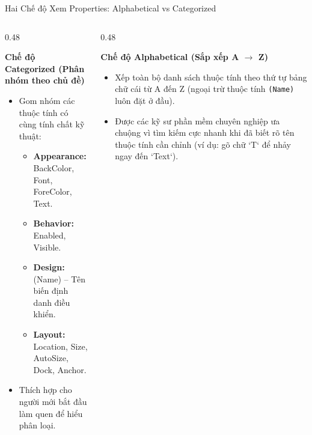 \documentclass[aspectratio=169, 10pt]{beamer}
\begin{document}
\begin{frame}{Hai Chế độ Xem Properties: Alphabetical vs Categorized}
  \begin{columns}[T]
    \begin{column}{0.48\textwidth}
      \begin{block}{\textbf{Chế độ Categorized (Phân nhóm theo chủ đề)}}
        \begin{itemize}\small
          \item Gom nhóm các thuộc tính có cùng tính chất kỹ thuật:
            \begin{itemize}\footnotesize
              \item \textbf{Appearance:} BackColor, Font, ForeColor, Text.
              \item \textbf{Behavior:} Enabled, Visible.
              \item \textbf{Design:} (Name) -- Tên biến định danh điều khiển.
              \item \textbf{Layout:} Location, Size, AutoSize, Dock, Anchor.
            \end{itemize}
          \item Thích hợp cho người mới bắt đầu làm quen để hiểu phân loại.
        \end{itemize}
      \end{block}
    \end{column}

    \begin{column}{0.48\textwidth}
      \begin{exampleblock}{\textbf{Chế độ Alphabetical (Sắp xếp A $\to$ Z)}}
        \begin{itemize}\small
          \item Xếp toàn bộ danh sách thuộc tính theo thứ tự bảng chữ cái từ A đến Z (ngoại trừ thuộc tính \texttt{(Name)} luôn đặt ở đầu).
          \item Được các kỹ sư phần mềm chuyên nghiệp ưa chuộng vì tìm kiếm cực nhanh khi đã biết rõ tên thuộc tính cần chỉnh (ví dụ: gõ chữ `T` để nhảy ngay đến `Text`).
        \end{itemize}
      \end{exampleblock}
    \end{column}
  \end{columns}
\end{frame}
\end{document}

